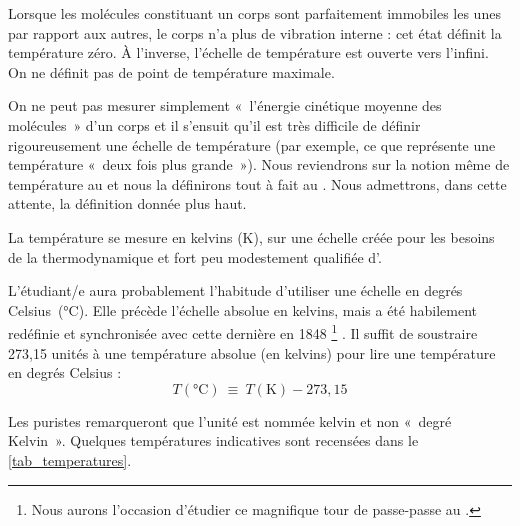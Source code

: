 		Lorsque les molécules constituant un corps sont parfaitement immobiles les unes par rapport aux autres, le corps n’a plus de vibration interne : cet état définit la température zéro. À l’inverse, l’échelle de température est ouverte vers l’infini. On ne définit pas de point de température maximale.

		On ne peut pas mesurer simplement «~l’énergie cinétique moyenne des molécules~» d’un corps et il s'ensuit qu’il est très difficile de définir rigoureusement une échelle de température (par exemple, ce que représente une température «~deux fois plus grande~»). Nous reviendrons sur la notion même de température au \coursquatre et nous la définirons tout à fait au \courssept. Nous admettrons, dans cette attente, la définition donnée plus haut.

		La température se mesure en \si{kelvins} (\si{\kelvin}), sur une échelle créée pour les besoins de la thermodynamique et fort peu modestement qualifiée d’.

		L’étudiant/e aura probablement l’habitude d’utiliser une échelle en \si{degrés} \si{Celsius}~(\si{\degreeCelsius}). Elle précède l’échelle absolue en \si{kelvins}, mais a été habilement redéfinie et synchronisée avec cette dernière en 1848%
			\footnote{Nous aurons l’occasion d’étudier ce magnifique tour de passe-passe au \courssept.}%
		. Il suffit de soustraire 273,15 unités à une température absolue (en \si{kelvins}) pour lire une température en \si{degrés} \si{Celsius} :
		\begin{equation}
			T(\si{\degreeCelsius})\ \equiv \ T(\si{\kelvin}) - 273,15
			\label{def_température_kelvins_celsius}
		\end{equation}

		Les puristes remarqueront que l’unité est nommée \si{kelvin} et non «~degré Kelvin~». Quelques températures indicatives sont recensées dans le \cref{tab_temperatures}.


